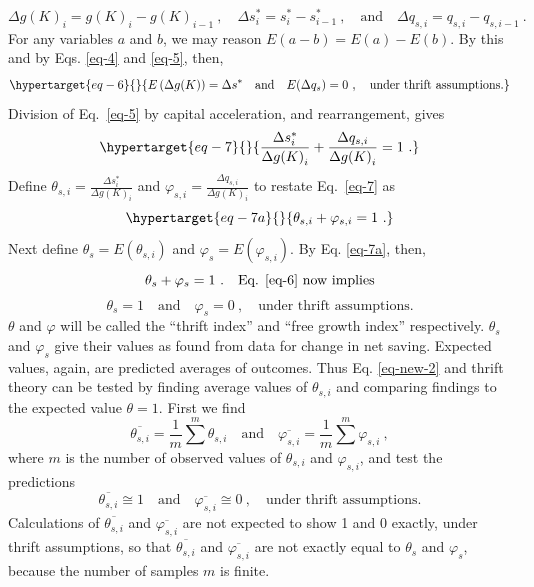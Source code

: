 %
\[\Delta g{(K)}_{i} = g{(K)}_{i} - g(K)_{i - 1} \ , \quad
\Delta s^{*}_{i} = s^{*}_{i} - s^{*}_{i - 1} \ , \quad \text{and} \quad
\Delta q_{s,i} = q_{s,i} - q_{s,i - 1} \ .\]
%
For any variables \(a\) and \(b\), we may reason
\(E(a - b) = E(a) - E(b)\). By this and by Eqs. \eqref{eq-4} and
\eqref{eq-5}, then,
%
\begin{equation}\protect\hypertarget{eq-6}{}{E\left( \Delta g(K) \right) =  \Delta s^{*} \quad  \text{and} \quad E(\Delta q_s) = 0 \ , \quad \text{under thrift assumptions.}}\label{eq-6}\end{equation}
%
Division of Eq.~\eqref{eq-5} by capital acceleration, and rearrangement,
gives
%
\begin{equation}\protect\hypertarget{eq-7}{}{\frac{\Delta s^{*}_{i}}{\Delta g{(K)}_{i}} + \frac{\Delta q_{s,i}}{\Delta g{(K)}_{i}} = 1 \ .}\label{eq-7}\end{equation}
%
Define \(\theta_{s,i} = \frac{\Delta s^{*}_{i}}{\Delta g{(K)}_{i}}\)
and \(\varphi_{s,i} = \frac{\Delta q_{s,i}}{\Delta g{(K)}_{i}}\) to
restate Eq.~\eqref{eq-7} as
%
\begin{equation}\protect\hypertarget{eq-7a}{}{\theta_{s,i} + \varphi_{s,i} = 1 \ .}\label{eq-7a}\end{equation}
%
Next define \(\theta_s = E(\theta_{s,i})\) and \(\varphi_s = E(\varphi_{s,i})\). By Eq. \eqref{eq-7a}, then,
%
\begin{equation}%
    \theta_s + \varphi_s = 1 \ . \quad \text{Eq. \eqref{eq-6} now implies}%
    \label{eq-new-1}%
\end{equation}%
%
\vspace{-5ex}%
%
\begin{equation}%
    \theta_s = 1 \quad \text{and} \quad \varphi_s = 0 \ , \quad \text{under thrift assumptions.}%
    \label{eq-new-2}%
\end{equation}%
%
\(\theta\) and \(\varphi\) will be called the ``thrift index'' and
``free growth index'' respectively. \(\theta_{s}\) and
\(\varphi_{s}\) give their values as found from data for change in net
saving. 
%
Expected values, again, are predicted averages of outcomes. Thus Eq. \eqref{eq-new-2} and thrift theory can be tested by finding average values of \(\theta_{s,i}\) and comparing findings to the expected value \(\theta = 1\). First we find
%
%
\[\overline{\theta_{s,i}} = \frac{1}{m} \sum^{m} \theta_{s,i} \quad \text{and} \quad
\overline{\varphi_{s,i}} = \frac{1}{m} \sum^{m} \varphi_{s,i}\ ,\]
%
where \(m\) is the number of observed values of \(\theta_{s,i}\) and
\(\varphi_{s,i}\), and test the predictions
\[
\overline{\theta_{s,i}} \cong 1 \quad \text{and} \quad \overline{\varphi_{s,i}} \cong 0\ , \quad \text{under thrift assumptions.}
\]
%
Calculations of \(\overline{\theta_{s,i}}\) and
\(\overline{\varphi_{s,i}}\) are not expected to show 1 and 0 exactly,
under thrift assumptions, so that \(\overline{\theta_{s,i}}\) and \(\overline{\varphi_{s,i}}\) are not exactly equal to \(\theta_s\) and \(\varphi_s\), because the number of samples \(m\) is finite.

